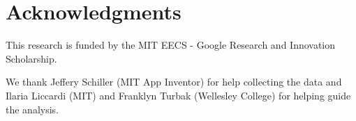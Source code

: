 \documentclass[conference]{IEEEtran}
\begin{document}
\section*{Acknowledgments}

This research is funded by the MIT EECS - Google Research and Innovation Scholarship. 

We thank Jeffery Schiller (MIT App Inventor) for help collecting the data and Ilaria Liccardi (MIT) and Franklyn Turbak (Wellesley College) for helping guide the analysis.




%
%
%

\newpage
\begin{thebibliography}{1}






\end{thebibliography}
\end{document}
